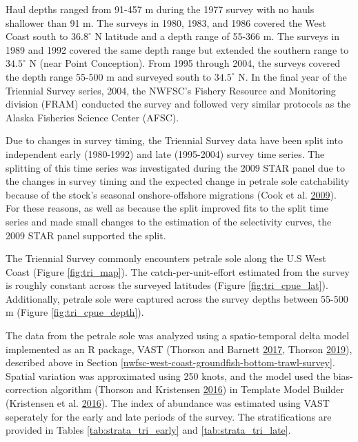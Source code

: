 \documentclass[12pt,]{article}
\begin{document}
Haul depths ranged from 91-457 m during the 1977 survey with no hauls
shallower than 91 m. The surveys in 1980, 1983, and 1986 covered the
West Coast south to \(36.8^\circ\) N latitude and a depth range of
55-366 m. The surveys in 1989 and 1992 covered the same depth range but
extended the southern range to \(34.5^\circ\) N (near Point Conception).
From 1995 through 2004, the surveys covered the depth range 55-500 m and
surveyed south to \(34.5^\circ\) N. In the final year of the Triennial
Survey series, 2004, the NWFSC's Fishery Resource and Monitoring
division (FRAM) conducted the survey and followed very similar protocols
as the Alaska Fisheries Science Center (AFSC).

Due to changes in survey timing, the Triennial Survey data have been
split into independent early (1980-1992) and late (1995-2004) survey
time series. The splitting of this time series was investigated during
the 2009 STAR panel due to the changes in survey timing and the expected
change in petrale sole catchability because of the stock's seasonal
onshore-offshore migrations (Cook et al.
\protect\hyperlink{ref-cook_petrale_2009}{2009}). For these reasons, as
well as because the split improved fits to the split time series and
made small changes to the estimation of the selectivity curves, the 2009
STAR panel supported the split.

The Triennial Survey commonly encounters petrale sole along the U.S West
Coast (Figure \ref{fig:tri_map}). The catch-per-unit-effort estimated
from the survey is roughly constant across the surveyed latitudes
(Figure \ref{fig:tri_cpue_lat}). Additionally, petrale sole were
captured across the survey depths between 55-500 m (Figure
\ref{fig:tri_cpue_depth}).

The data from the petrale sole was analyzed using a spatio-temporal
delta model implemented as an R package, VAST (Thorson and Barnett
\protect\hyperlink{ref-thorson_comparing_2017}{2017}, Thorson
\protect\hyperlink{ref-thorson_guidance_2019}{2019}), described above in
Section \ref{nwfsc-west-coast-groundfish-bottom-trawl-survey}. Spatial
variation was approximated using 250 knots, and the model used the
bias-correction algorithm (Thorson and Kristensen
\protect\hyperlink{ref-thorson_implementing_2016}{2016}) in Template
Model Builder (Kristensen et al.
\protect\hyperlink{ref-kristensen_tmb:_2016}{2016}). The index of
abundance was estimated using VAST seperately for the early and late
periods of the survey. The stratifications are provided in Tables
\ref{tab:strata_tri_early} and \ref{tab:strata_tri_late}.
\end{document}

